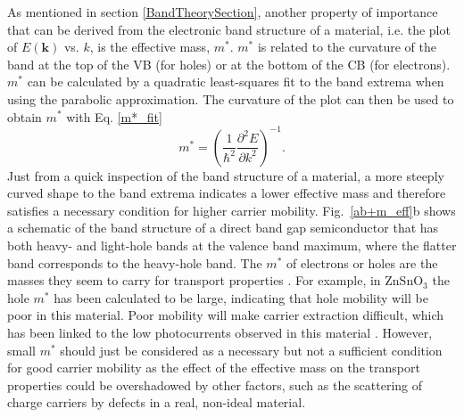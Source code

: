 \documentclass[11pt, twoside]{report}
\begin{document}
As mentioned in section \ref{BandTheorySection}, another property of importance that can be derived from the electronic band structure of a material, i.e. the plot of $E(\boldsymbol{k})$ vs. $k$, is the effective mass, $m^*$. $m^*$ is related to the curvature of the band at the top of the VB (for holes) or at the bottom of the CB (for electrons). $m^*$ can be calculated by a quadratic least-squares fit to the band extrema when using the parabolic approximation. The curvature of the plot can then be used to obtain $m^*$ with Eq. \ref{m*_fit}
\begin{equation}\label{m*_fit}
m^* = \left( \frac{1}{\hbar^2}\frac{\partial^2 E}{\partial k^2} \right)^{-1} .
\end{equation}
Just from a quick inspection of the band structure of a material, a more steeply curved shape to the band extrema indicates a lower effective mass and therefore satisfies a necessary condition for higher carrier mobility. Fig.~\ref{ab+m_eff}b shows a schematic of the band structure of a direct band gap semiconductor that has both heavy- and light-hole bands at the valence band maximum, where the flatter band corresponds to the heavy-hole band.
The $m^*$ of electrons or holes are the masses they seem to carry for transport properties \cite{dielectric_const1}. For example, in ZnSnO$_3$ the hole $m^*$ has been calculated to be large, indicating that hole mobility will be poor in this material. Poor mobility will make carrier extraction difficult, which has been linked to the low photocurrents observed in this material \cite{effective_mass1}.
However, small $m^*$ should just be considered as a necessary but not a sufficient condition for good carrier mobility as the effect of the effective mass on the transport properties could be overshadowed by other factors, such as the scattering of charge carriers by defects in a real, non-ideal material. 
\end{document}
